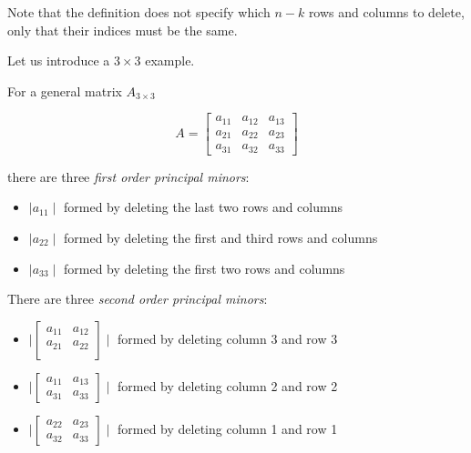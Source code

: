 \documentclass[12pt,openright,twoside,a4paper]{book}
\begin{document}
\vspace{5mm}

Note that the definition does not specify which $n-k$ rows and columns to delete, only that their indices must be the same.

Let us introduce a $3 \times 3$ example.

For a general matrix $A_{3\times 3}$ 

\begin{equation}
A=
\begin{bmatrix}
         a_{11} & a_{12} & a_{13} \\
    	    a_{21} & a_{22} & a_{23} \\ 
	    a_{31} & a_{32} & a_{33}  
\end{bmatrix}
\end{equation}

\vspace{5mm}

there are three \textit{first order principal minors}:

\begin{itemize}
\item $\mid a_{11}\mid$ formed by deleting the last two rows and columns
\item $\mid a_{22}\mid$ formed by deleting the first and third rows and columns
\item $\mid a_{33}\mid$ formed by deleting the first two rows and columns

\end{itemize}

There are three \textit{second order principal minors}:

\begin{itemize}
\item 
$\mid\begin{bmatrix}
         a_{11} & a_{12}  \\
    	    a_{21} & a_{22}  \\ 
\end{bmatrix}\mid$ formed by deleting column 3 and row 3

\item
$\mid\begin{bmatrix}
         a_{11}  & a_{13} \\
	    a_{31}  & a_{33}  
\end{bmatrix}\mid$ formed by deleting column 2 and row 2

\item
$\mid\begin{bmatrix}
         a_{22} & a_{23} \\ 
	     a_{32} & a_{33}  
\end{bmatrix}\mid$ formed by deleting column 1 and row 1

\end{itemize}
\end{document}
